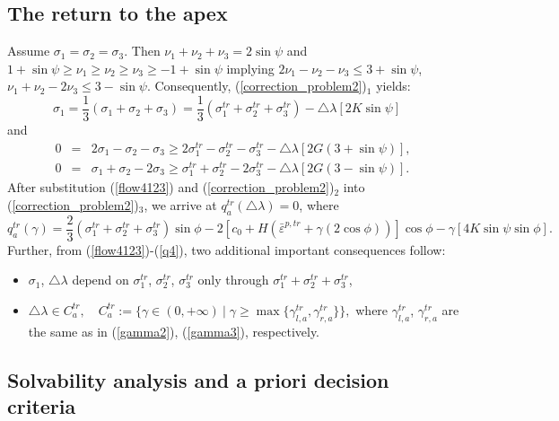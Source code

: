 \documentclass[a4paper,12pt]{article}
\theoremstyle{remark}
\numberwithin{equation}{section}
\begin{document}
\subsection{The return to the apex} 
\label{subsec_apex}

Assume $\sigma_1=\sigma_2=\sigma_3$. Then $ \nu_1+ \nu_2+ \nu_3=2\sin\psi$ and $1+\sin\psi\geq \nu_1\geq \nu_2\geq \nu_3\geq-1+\sin\psi$ implying $2\nu_1-\nu_2-\nu_3\leq3+\sin\psi$, $\nu_1+\nu_2-2\nu_3\leq3-\sin\psi$. Consequently, (\ref{correction_problem2})$_1$ yields:
\begin{equation}
\sigma_1=\frac{1}{3}(\sigma_1+\sigma_2+\sigma_3)=\frac{1}{3}(\sigma_1^{tr}+\sigma_2^{tr}+\sigma_3^{tr})-\triangle\lambda[2K\sin\psi]\quad\label{flow4123}
\end{equation}
and
\begin{eqnarray}
0&=&2\sigma_1-\sigma_2-\sigma_3\geq2\sigma_1^{tr}-\sigma_2^{tr}-\sigma_3^{tr}-\triangle\lambda[2G(3+\sin\psi)],\label{est_apex1}\\
0&=&\sigma_1+\sigma_2-2\sigma_3\geq\sigma_1^{tr}+\sigma_2^{tr}-2\sigma_3^{tr}-\triangle\lambda[2G(3-\sin\psi)].\label{est_apex2}
\end{eqnarray}
After substitution (\ref{flow4123}) and (\ref{correction_problem2})$_2$ into (\ref{correction_problem2})$_3$, we arrive at $q_a^{tr}(\triangle\lambda)=0$, where 
\begin{equation}
q^{tr}_a(\gamma)=\frac{2}{3}(\sigma_1^{tr}+\sigma_2^{tr}+\sigma_3^{tr})\sin\phi-2\left[c_0+H\left(\bar{\varepsilon}^{p,tr}+\gamma (2\cos\phi)\right)\right]\cos\phi-\gamma[4K\sin\psi\sin\phi]. \label{q4}
\end{equation}
Further, from (\ref{flow4123})-(\ref{q4}),  two additional important consequences follow:
\begin{itemize}
\item $\sigma_1$, $\triangle\lambda$ depend on $\sigma^{tr}_1$, $\sigma^{tr}_2$, $\sigma^{tr}_3$ only through $\sigma^{tr}_1+\sigma^{tr}_2+\sigma^{tr}_3$,
\item $\triangle\lambda\in C^{tr}_a,\quad C^{tr}_a:=\{\gamma\in(0,+\infty)\ |\; \gamma\geq\max\{\gamma^{tr}_{l,a},\gamma^{tr}_{r,a}\}\},$
where $\gamma^{tr}_{l,a}$, $\gamma^{tr}_{r,a}$ are the same as in (\ref{gamma2}), (\ref{gamma3}), respectively. 
\end{itemize}

\subsection{Solvability analysis and a priori decision criteria}
\label{subsec_lambda}
\end{document}
